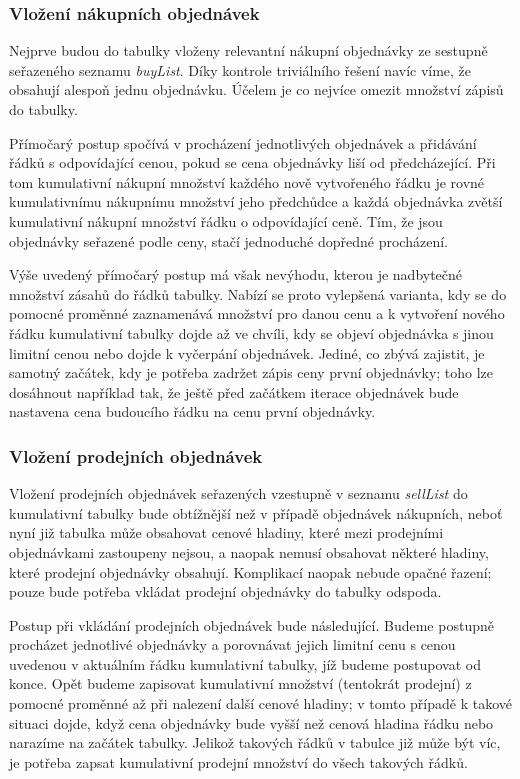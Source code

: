 \documentclass[thesis=M,czech]{FITthesis}[2012/06/26]
\begin{document}
\subsubsection{Vložení nákupních objednávek}

Nejprve budou do tabulky vloženy relevantní nákupní objednávky ze sestupně seřazeného seznamu \textit{buyList}. Díky kontrole 
triviálního řešení navíc víme, že obsahují alespoň jednu objednávku. Účelem je co nejvíce omezit množství zápisů do tabulky.

Přímočarý postup spočívá v procházení jednotlivých objednávek a přidávání řádků s odpovídající cenou, pokud se cena objednávky liší 
od předcházející. Při tom kumulativní nákupní množství každého nově vytvořeného řádku je rovné kumulativnímu nákupnímu množství 
jeho předchůdce a každá objednávka zvětší kumulativní nákupní množství řádku o odpovídající ceně. Tím, že jsou objednávky seřazené 
podle ceny, stačí jednoduché dopředné procházení.

Výše uvedený přímočarý postup má však nevýhodu, kterou je nadbytečné množství zásahů do řádků tabulky. Nabízí se proto vylepšená 
varianta, kdy se do pomocné proměnné zaznamenává  množství pro danou cenu a k vytvoření nového řádku kumulativní 
tabulky dojde až ve chvíli, kdy se objeví objednávka s jinou limitní cenou nebo dojde k vyčerpání objednávek. Jediné, co zbývá zajistit, 
je samotný začátek, kdy je potřeba zadržet zápis ceny první objednávky; toho lze dosáhnout například tak, že ještě před začátkem 
iterace objednávek bude nastavena cena budoucího řádku na cenu první objednávky.


\subsubsection{Vložení prodejních objednávek}

Vložení prodejních objednávek seřazených vzestupně v seznamu \textit{sellList} do kumulativní tabulky bude obtížnější než v případě 
objednávek nákupních, neboť nyní již tabulka může obsahovat cenové hladiny, které mezi prodejními objednávkami zastoupeny nejsou, 
a naopak nemusí obsahovat některé hladiny, které prodejní objednávky obsahují. Komplikací naopak nebude opačné řazení; pouze bude 
potřeba vkládat prodejní objednávky do tabulky odspoda.

Postup při vkládání prodejních objednávek bude následující. Budeme postupně procházet jednotlivé objednávky a porovnávat jejich 
limitní cenu s cenou uvedenou v aktuálním řádku kumulativní tabulky, jíž budeme postupovat od konce. Opět budeme zapisovat kumulativní 
množství (tentokrát prodejní) z pomocné proměnné až při nalezení další cenové hladiny; v tomto případě k takové situaci dojde, když 
cena objednávky bude vyšší než cenová hladina řádku nebo narazíme na začátek tabulky. Jelikož takových řádků v tabulce již může být 
víc, je potřeba zapsat kumulativní prodejní množství do všech takových řádků.
\end{document}

